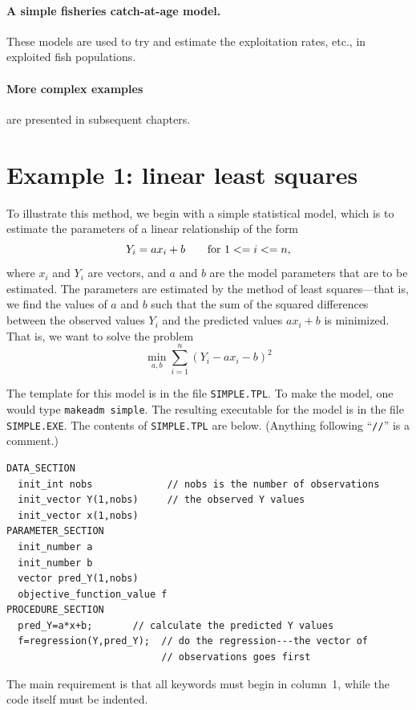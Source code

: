 \documentclass{admbmanual}
\begin{document}
\paragraph{A simple fisheries catch-at-age model.} These models
are used to try and estimate the exploitation rates, etc., in
exploited fish populations. 

\paragraph{More complex examples} are presented in subsequent chapters. 


\section{Example 1: linear least squares}

To illustrate this method, we begin with a simple statistical
model, which is to estimate the parameters of
a linear relationship of the form 
$$Y_{i} =ax_i+b\qquad \hbox{\rm for}\ 1<=i<=n,$$
where $x_i$ and $Y_i$ are vectors, and $a$ and $b$ are the model parameters
that are to be estimated. The parameters are estimated by the method
of least squares---that is, we find the values of $a$ and $b$ such that
the sum of the squared differences between the observed values
$Y_i$ and the predicted values $ax_i+b$ is minimized. That is,
we want to solve the problem
$$\min_{a,b}\sum_{i=1}^n(Y_i-ax_i-b)^2$$   

The template for this model is in the file \texttt{SIMPLE.TPL}. To
make the model, one would type \texttt{makeadm simple}. The resulting 
executable for the model is in the file \texttt{SIMPLE.EXE}.
The contents of \texttt{SIMPLE.TPL} are below.  (Anything following ``\texttt{//}'' is a comment.)
\begin{lstlisting}
DATA_SECTION
  init_int nobs             // nobs is the number of observations
  init_vector Y(1,nobs)     // the observed Y values
  init_vector x(1,nobs)
PARAMETER_SECTION
  init_number a   
  init_number b   
  vector pred_Y(1,nobs)
  objective_function_value f
PROCEDURE_SECTION
  pred_Y=a*x+b;       // calculate the predicted Y values
  f=regression(Y,pred_Y);  // do the regression---the vector of 
                           // observations goes first
\end{lstlisting}
The main requirement is that all keywords must begin in column~1,
while the code itself must be indented.  
\end{document}
